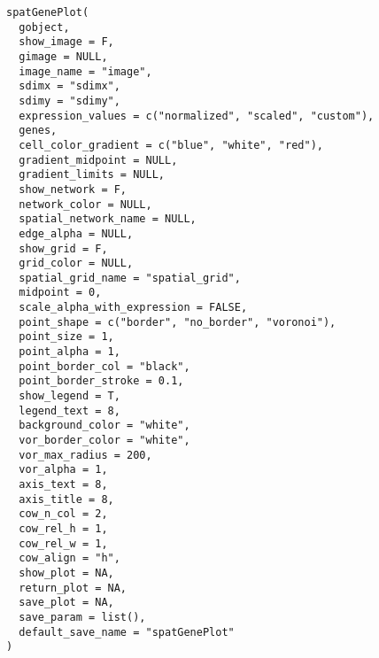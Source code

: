 \documentclass[a4paper]{book}
\begin{document}
\begin{Usage}
\begin{verbatim}
spatGenePlot(
  gobject,
  show_image = F,
  gimage = NULL,
  image_name = "image",
  sdimx = "sdimx",
  sdimy = "sdimy",
  expression_values = c("normalized", "scaled", "custom"),
  genes,
  cell_color_gradient = c("blue", "white", "red"),
  gradient_midpoint = NULL,
  gradient_limits = NULL,
  show_network = F,
  network_color = NULL,
  spatial_network_name = NULL,
  edge_alpha = NULL,
  show_grid = F,
  grid_color = NULL,
  spatial_grid_name = "spatial_grid",
  midpoint = 0,
  scale_alpha_with_expression = FALSE,
  point_shape = c("border", "no_border", "voronoi"),
  point_size = 1,
  point_alpha = 1,
  point_border_col = "black",
  point_border_stroke = 0.1,
  show_legend = T,
  legend_text = 8,
  background_color = "white",
  vor_border_color = "white",
  vor_max_radius = 200,
  vor_alpha = 1,
  axis_text = 8,
  axis_title = 8,
  cow_n_col = 2,
  cow_rel_h = 1,
  cow_rel_w = 1,
  cow_align = "h",
  show_plot = NA,
  return_plot = NA,
  save_plot = NA,
  save_param = list(),
  default_save_name = "spatGenePlot"
)
\end{verbatim}
\end{Usage}
%
\end{document}

